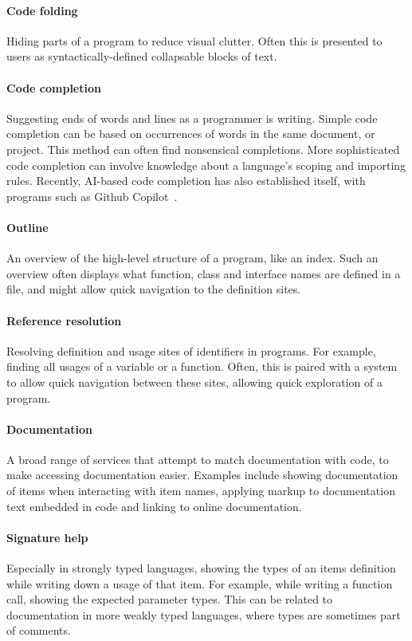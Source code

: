 \paragraph{Code folding}
Hiding parts of a program to reduce visual clutter.
Often this is presented to users as syntactically-defined collapsable blocks of text.

\paragraph{Code completion}
Suggesting ends of words and lines as a programmer is writing.
Simple code completion can be based on occurrences of words in the same document, or project.
This method can often find nonsensical completions.
More sophisticated code completion can involve knowledge about a language's scoping and importing rules.
Recently, AI-based code completion has also established itself, with programs such as Github Copilot~\autocite{copilot}.

\paragraph{Outline}
An overview of the high-level structure of a program, like an index.
Such an overview often displays what function, class and interface names are defined in a file,
and might allow quick navigation to the definition sites.

\paragraph{Reference resolution}
Resolving definition and usage sites of identifiers in programs.
For example, finding all usages of a variable or a function.
Often, this is paired with a system to allow quick navigation between these sites, allowing quick exploration of a program.

\paragraph{Documentation}
A broad range of services that attempt to match documentation with code, to make accessing documentation easier.
Examples include showing documentation of items when interacting with item names, applying markup to documentation
text embedded in code and linking to online documentation.

\paragraph{Signature help}
Especially in strongly typed languages, showing the types of an items definition while writing down a usage of that item.
For example, while writing a function call, showing the expected parameter types.
This can be related to documentation in more weakly typed languages, where types are sometimes part of comments.

